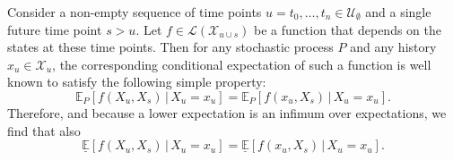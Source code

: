 \documentclass[10pt,a4paper]{paper}
\theoremstyle{definition}
\newcommand{\states}{\mathcal{X}}
\newcommand{\gambles}{\mathcal{L}}
\begin{document}
Consider a non-empty sequence of time points $u=t_0,\ldots,t_n\in\mathcal{U}_\emptyset$ and a single future time point $s>u$. Let $f\in\gambles(\states_{u\cup s})$ be a function that depends on the states at these time points. Then for any stochastic process $P$ and any history $x_u\in\states_u$, the corresponding conditional expectation of such a function is well known to satisfy the following simple property:
\vspace{-2pt}
\begin{equation*}
\mathbb{E}_P[f(X_u,X_s)\,\vert\,X_u=x_u] = \mathbb{E}_P[f(x_u,X_s)\,\vert\,X_u=x_u].
\end{equation*}
Therefore, and because a lower expectation is an infimum over expectations, we find that also
\vspace{-2pt}
\begin{equation}\label{eq:fixxu}
\underline{\mathbb{E}}[f(X_u,X_s)\,\vert\,X_u=x_u] = \underline{\mathbb{E}}[f(x_u,X_s)\,\vert\,X_u=x_u].
\end{equation}\\[-18pt]
\end{document}
